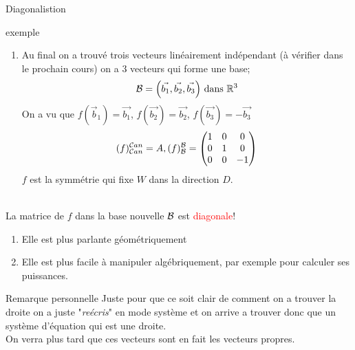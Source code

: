 \begin{parag}{Diagonalistion}
\begin{subparag}{exemple}
\begin{enumerate}
    \item Au final on a trouvé trois vecteurs linéairement indépendant (à vérifier dans le prochain cours) on a $3$ vecteurs qui forme une base;
    \[\bmath = \left(\vec{b_1}, \vec{b_2}, \vec{b_3} \right) \text{ dans } \mathbb{R}^3\]
    On a vu que $f(\vec{b}_1) = \vec{b_1}$, $f(\vec{b_2})= \vec{b_2}$, $f(\vec{b_3}) = -\vec{b_3}$\\
    \[(f)_{\mathcal{C} an}^{\mathcal{C} an} = A, (f)_{\mathcal{B}}^{\mathcal{B}} = \begin{pmatrix}
        1 & 0 & 0 \\
        0 & 1 & 0 \\
        0 & 0 & -1
    \end{pmatrix}\]
    $f$ est la symmétrie qui fixe $W$ dans la direction $D$.
    \end{enumerate}
    \\
    La matrice de $f$ dans la base nouvelle $\mathcal{B}$ est \textcolor{red}{diagonale}!
    \begin{enumerate}
        \item Elle est plus parlante géométriquement
        \item Elle est plus facile à manipuler algébriquement, par exemple  pour calculer ses puissances.
    \end{enumerate}
    \end{subparag}
    \begin{subparag}{Remarque personnelle}
        Juste pour que ce soit clair de comment on a trouver la droite on a juste "\textit{reécris}" en mode système et on arrive a trouver donc que un système d'équation qui est une droite.\\
        On verra plus tard que ces vecteurs sont en fait les vecteurs propres.
    \end{subparag}
\end{parag}


